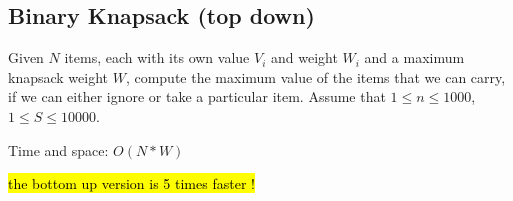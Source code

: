 \subsection{Binary Knapsack (top down)}

Given $N$ items, each with its own value $V_i$ and weight $W_i$ and a maximum knapsack weight $W$, compute the maximum value of the items that we can carry, if we can either ignore or take a particular item. Assume that $1 \leq n \leq 1000$, $1 \leq S \leq 10 000$.

Time and space: $O(N*W)$

\hl{the bottom up version is 5 times faster !}
